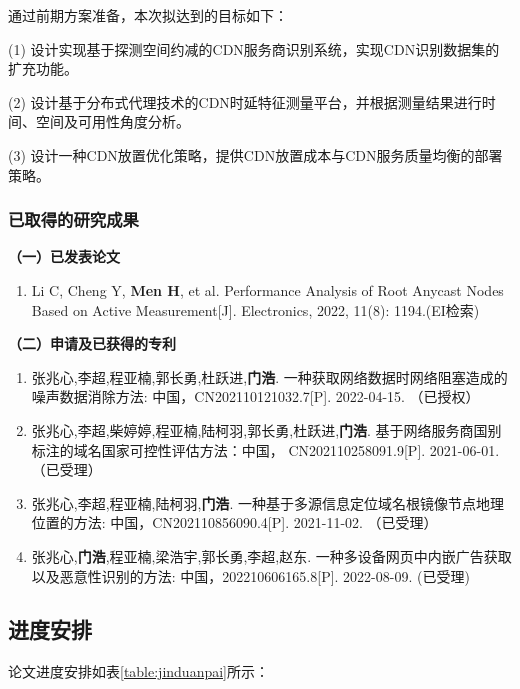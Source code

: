 通过前期方案准备，本次拟达到的目标如下：

(1) 设计实现基于探测空间约减的CDN服务商识别系统，实现CDN识别数据集的扩充功能。

(2) 设计基于分布式代理技术的CDN时延特征测量平台，并根据测量结果进行时间、空间及可用性角度分析。

(3) 设计一种CDN放置优化策略，提供CDN放置成本与CDN服务质量均衡的部署策略。

\subsubsection{已取得的研究成果}

	\noindent\textbf{（一）已发表论文}
	\begin{enumerate}
	\item Li C, Cheng Y, \textbf{Men H}, et al. Performance Analysis of Root Anycast Nodes Based on Active Measurement[J]. Electronics, 2022, 11(8): 1194.(EI检索)
\end{enumerate}
\noindent\textbf{（二）申请及已获得的专利}
\begin{enumerate}
\item 张兆心,李超,程亚楠,郭长勇,杜跃进,\textbf{门浩}. 一种获取网络数据时网络阻塞造成的噪声数据消除方法: 中国，CN202110121032.7[P]. 2022-04-15. （已授权）
\item 张兆心,李超,柴婷婷,程亚楠,陆柯羽,郭长勇,杜跃进,\textbf{门浩}. 基于网络服务商国别标注的域名国家可控性评估方法：中国， CN202110258091.9[P]. 2021-06-01.（已受理）
\item 张兆心,李超,程亚楠,陆柯羽,\textbf{门浩}. 一种基于多源信息定位域名根镜像节点地理位置的方法: 中国，CN202110856090.4[P]. 2021-11-02. （已受理）
\item 张兆心,\textbf{门浩},程亚楠,梁浩宇,郭长勇,李超,赵东. 一种多设备网页中内嵌广告获取以及恶意性识别的方法: 中国，202210606165.8[P]. 2022-08-09. (已受理)
\end{enumerate}

	

\subsection{进度安排}
论文进度安排如表\ref{table:jinduanpai}所示：


